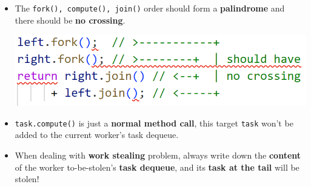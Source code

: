 \documentclass[10pt, landscape]{article}
\begin{document}
\begin{multicols}{4}
\begin{enumerate}
\begin{itemize}
        \item The \texttt{fork(), compute(), join()} order should form a \textbf{palindrome} and there should be \textbf{no crossing}. \\
        \centerline{\includegraphics[width=0.8\linewidth]{Paper/Final/images/4.png}}
        \item \texttt{task.compute()} is just a \textbf{normal method call}, this target \texttt{task} won't be added to the current worker's task dequeue.
        \item When dealing with \textbf{work stealing} problem, always write down the \textbf{content} of the worker to-be-stolen's \textbf{task dequeue}, and its \textbf{task at the tail} will be stolen!
    \end{itemize}
\end{enumerate}

\end{multicols}
\end{document}
